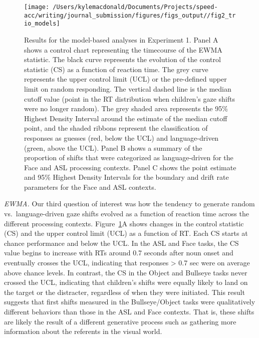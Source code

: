 \documentclass[,man,floatsintext]{apa6}
\begin{document}
\begin{figure}[!t]

{\centering \texttt{[image: /Users/kylemacdonald/Documents/Projects/speed-acc/writing/journal\_submission/figures/figs\_output//fig2\_trio\_models]} 

}

\caption{Results for the model-based analyses in Experiment 1. Panel A shows a control chart representing the timecourse of the EWMA statistic. The black curve represents the evolution of the control statistic (CS) as a function of reaction time. The grey curve represents the upper control limit (UCL) or the pre-defined upper limit on random responding. The vertical dashed line is the median cutoff value (point in the RT distribution when children's gaze shifts were no longer random). The grey shaded area represents the 95\% Highest Density Interval around the estimate of the median cutoff point, and the shaded ribbons represent the classification of responses as guesses (red, below the UCL) and language-driven (green, above the UCL). Panel B shows a summary of the proportion of shifts that were categorized as language-driven for the Face and ASL processing contexts. Panel C shows the point estimate and 95\% Highest Density Intervals for the boundary and drift rate parameters for the Face and ASL contexts.}\label{fig:trio-model-plot}
\end{figure}

\emph{EWMA.} Our third question of interest was how the tendency to generate random vs.~language-driven gaze shifts evolved as a function of reaction time across the different processing contexts. Figure~\ref{fig:trio-model-plot}A shows changes in the control statistic (CS) and the upper control limit (UCL) as a function of RT. Each CS starts at chance performance and below the UCL. In the ASL and Face tasks, the CS value begins to increase with RTs around 0.7 seconds after noun onset and eventually crosses the UCL, indicating that responses \textgreater{} 0.7 sec were on average above chance levels. In contrast, the CS in the Object and Bullseye tasks never crossed the UCL, indicating that children's shifts were equally likely to land on the target or the distracter, regardless of when they were initiated. This result suggests that first shifts measured in the Bullseye/Object tasks were qualitatively different behaviors than those in the ASL and Face contexts. That is, these shifts are likely the result of a different generative process such as gathering more information about the referents in the visual world.
\end{document}
